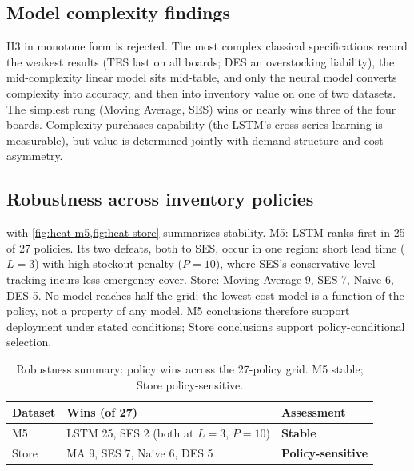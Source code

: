 \subsection{Model complexity findings}
\label{sec:complexity}
H3 in monotone form is rejected. The most complex classical specifications
record the weakest results (TES last on all boards; DES an overstocking
liability), the mid-complexity linear model sits mid-table, and only the
neural model converts complexity into accuracy, and then into inventory value
on one of two datasets. The simplest rung (Moving Average, SES) wins or
nearly wins three of the four boards. Complexity purchases capability (the
LSTM's cross-series learning is measurable), but value is determined jointly
with demand structure and cost asymmetry.

\subsection{Robustness across inventory policies}
\label{sec:robust}
 with \cref{fig:heat-m5,fig:heat-store} summarizes
stability. M5: LSTM ranks first in 25 of 27 policies. Its two defeats, both
to SES, occur in one region: short lead time ($L=3$) with high stockout
penalty ($P=10$), where SES's conservative level-tracking incurs less
emergency cover. Store: Moving Average 9, SES 7, Naive 6, DES 5. No model
reaches half the grid; the lowest-cost model is a function of the policy, not
a property of any model. M5 conclusions therefore support deployment under
stated conditions; Store conclusions support policy-conditional selection.

\begin{table}[H]
\centering
\caption{Robustness summary: policy wins across the 27-policy grid. M5 stable; Store policy-sensitive.}
\label{tab:robust}
\begin{tabular}{lll}
\toprule
Dataset & Wins (of 27) & Assessment \\
\midrule
M5 & LSTM 25, SES 2 (both at $L{=}3$, $P{=}10$) & \textbf{Stable} \\
Store & MA 9, SES 7, Naive 6, DES 5 & \textbf{Policy-sensitive} \\
\bottomrule
\end{tabular}
\end{table}

